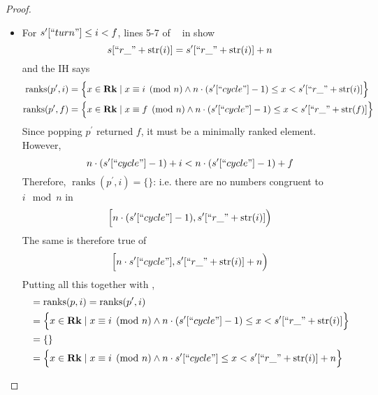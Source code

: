 \documentclass{amsart}
\DeclareMathOperator{\Rk}{\mathbf{Rk}}
\DeclareMathOperator{\zpostpop}{z_{\mathrm{post-pop}}}
\DeclareMathOperator{\ranks}{\mathrm{ranks}}
\theoremstyle{definition}
\begin{document}
\begin{proof}
\begin{enumerate}
\begin{enumerate}
\begin{itemize}
                        \item For $s^\prime[``turn"] \leq i < f$, lines 5-7 of $\zpostpop$ in  show
                            $$s[``r\_" + \mathrm{str}(i)] = s^\prime[``r\_" + \mathrm{str}(i)] + n$$
                            and the IH says
                            \begin{align*}
                                \ranks(p^\prime, i) &= 
                                \Big\{x \in \Rk \mid x \equiv i \pmod n \land n \cdot (s^\prime[``cycle"] - 1) \leq x < s^\prime[``r\_" + \mathrm{str}(i)]\Big\}\\
                                \ranks(p^\prime, f) &= 
                                \Big\{x \in \Rk \mid x \equiv f \pmod n \land n \cdot (s^\prime[``cycle"] - 1) \leq x < s^\prime[``r\_" + \mathrm{str}(f)]\Big\} 
                            \end{align*}
                            Since popping $p^\prime$ returned $f$, it must be a minimally ranked element.
                            However,
                            $$
                                n \cdot (s^\prime[``cycle"] - 1) + i
                                < 
                                n \cdot (s^\prime[``cycle"] - 1) + f
                            $$
                            Therefore, $\ranks(p^\prime, i) = \{\}$:
                            i.e. there are no numbers congruent to $i \mod n$ in
                            $$
                                \Big[n \cdot (s^\prime[``cycle"] - 1), s^\prime[``r\_" + \mathrm{str}(i)]\Big)
                            $$
                            The same is therefore true of
                            $$
                                \Big[n \cdot s^\prime[``cycle"], s^\prime[``r\_" + \mathrm{str}(i)] + n\Big)
                            $$
                            Putting all this together with ,
                            \begin{align*}
                                &= \ranks(p, i) = \ranks(p^\prime, i)\\
                                &=
                                \Big\{x \in \Rk \mid x \equiv i \pmod n \land n \cdot (s^\prime[``cycle"] - 1) \leq x < s^\prime[``r\_" + \mathrm{str}(i)]\Big\}\\
                                &= \{\}\\
                                &=
                                \Big\{x \in \Rk \mid x \equiv i \pmod n \land n \cdot s^\prime[``cycle"] \leq x < s^\prime[``r\_" + \mathrm{str}(i)] + n\Big\}\\

\end{align*}
\end{itemize}
\end{enumerate}
\end{enumerate}
\end{proof}
\end{document}
